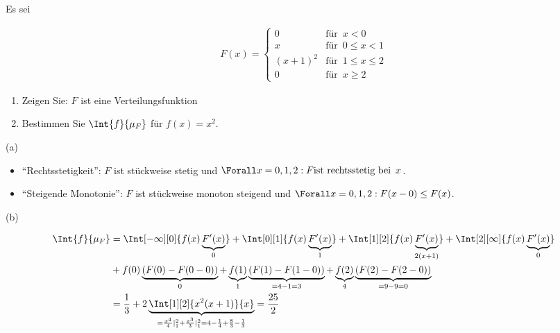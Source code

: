 
\begin{exercise}

Es sei

\begin{align*}
  F(x) =
  \begin{cases}
    0         & \text{für} \enspace x < 0 \\
    x         & \text{für} \enspace 0 \leq x < 1 \\
    (x + 1)^2 & \text{für} \enspace 1 \leq x \leq 2 \\
    0         & \text{für} \enspace x \geq 2
  \end{cases}
\end{align*}

\begin{enumerate}[label = (\alph*)]

  \item
  Zeigen Sie: $F$ ist eine Verteilungsfunktion
  
  \item
  Bestimmen Sie $\Int{f}{\mu_F}$ für $f(x) = x^2$.

\end{enumerate}

\end{exercise}


\begin{solution}

(a) \phantom{}

\begin{itemize}

  \item \enquote{Rechtsstetigkeit}: $F$ ist stückweise stetig und $\Forall x = 0, 1, 2: F \text{ist rechtsstetig bei} \enspace x$.

  \item \enquote{Steigende Monotonie}: $F$ ist stückweise monoton steigend und $\Forall x = 0, 1, 2: F(x - 0) \leq F(x)$.

\end{itemize}

(b)

\begin{align*}
  \Int{f}{\mu_F}
  & =
  \Int[-\infty][0]{f(x) \underbrace{F^\prime(x)}_0}
  +
  \Int[0][1]{f(x) \underbrace{F^\prime(x)}_1}
  +
  \Int[1][2]{f(x) \underbrace{F^\prime(x)}_{2 (x+1)}}
  +
  \Int[2][\infty]{f(x) \underbrace{F^\prime(x)}_0} \\
  & +
  f(0) \underbrace{(F(0) - F(0 - 0))}_0
  +
  \underbrace{f(1)}_1 \underbrace{(F(1) - F(1 - 0))}_{= 4-1 = 3}
  +
  \underbrace{f(2)}_4 \underbrace{(F(2) - F(2 - 0))}_{= 9-9 = 0} \\
  & =
  \frac{1}{3}
  +
  2 \underbrace
  {
    \Int[1][2]{x^2 (x + 1)}{x}
  }_{
    = \frac{x^4}{4} |_1^2 + \frac{x^3}{3} |_1^2
    = 4 - \frac{1}{4} + \frac{8}{3} - \frac{1}{3}
  }
  =
  \frac{25}{2}
\end{align*}

\end{solution}

